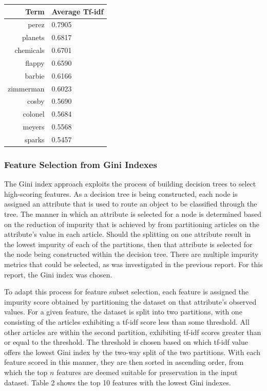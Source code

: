 \documentclass[11pt]{article}
\begin{document}
\begin{center}
\begin{tabular}{ |r|l| } 
 \hline
 Term & Average Tf-idf \\
 \hline
 perez       &   0.7905 \\
 planets     &   0.6817 \\
 chemicals   &   0.6701 \\
 flappy      &   0.6590 \\
 barbie      &   0.6166 \\
 zimmerman   &   0.6023 \\
 cosby       &   0.5690 \\
 colonel     &   0.5684 \\
 meyers      &   0.5568 \\
 sparks      &   0.5457 \\ 
 \hline
\end{tabular}
\end{center}

\subsubsection{Feature Selection from Gini Indexes}

The Gini index approach exploits the process of building decision trees to select high-scoring features.
As a decision tree is being constructed, each node is assigned an attribute that is used to route an object to be classified through the tree.
The manner in which an attribute is selected for a node is determined based on the reduction of impurity that is achieved by from partitioning articles on the attribute's value in each article.
Should the splitting on one attribute result in the lowest impurity of each of the partitions, then that attribute is selected for the node being constructed within the decision tree.
There are multiple impurity metrics that could be selected, as was investigated in the previous report.
For this report, the Gini index was chosen.

To adapt this process for feature subset selection, each feature is assigned the impurity score obtained by partitioning the dataset on that attribute's observed values.
For a given feature, the dataset is split into two partitions, with one consisting of the articles exhibiting a tf-idf score less than some threshold.
All other articles are within the second partition, exhibiting tf-idf scores greater than or equal to the threshold.
The threshold is chosen based on which tf-idf value offers the lowest Gini index by the two-way split of the two partitions.
With each feature scored in this manner, they are then sorted in ascending order, from which the top $n$ features are deemed suitable for preservation in the input dataset.
Table 2 shows the top 10 features with the lowest Gini indexes.
\end{document}
